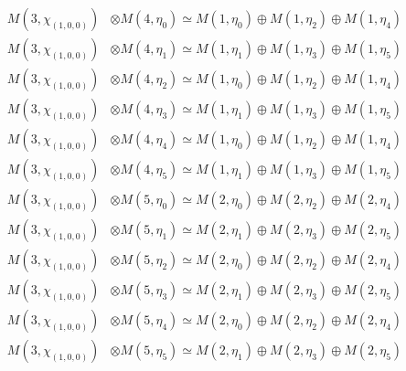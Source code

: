 \begin{align*}
M(3,\chi_{(1,0,0)}) &\otimes M(4,\eta_{0}) \simeq M(1,\eta_{0}) \oplus M(1,\eta_{2}) \oplus M(1,\eta_{4}) \\
M(3,\chi_{(1,0,0)}) &\otimes M(4,\eta_{1}) \simeq M(1,\eta_{1}) \oplus M(1,\eta_{3}) \oplus M(1,\eta_{5}) \\
M(3,\chi_{(1,0,0)}) &\otimes M(4,\eta_{2}) \simeq M(1,\eta_{0}) \oplus M(1,\eta_{2}) \oplus M(1,\eta_{4}) \\
M(3,\chi_{(1,0,0)}) &\otimes M(4,\eta_{3}) \simeq M(1,\eta_{1}) \oplus M(1,\eta_{3}) \oplus M(1,\eta_{5}) \\
M(3,\chi_{(1,0,0)}) &\otimes M(4,\eta_{4}) \simeq M(1,\eta_{0}) \oplus M(1,\eta_{2}) \oplus M(1,\eta_{4}) \\
M(3,\chi_{(1,0,0)}) &\otimes M(4,\eta_{5}) \simeq M(1,\eta_{1}) \oplus M(1,\eta_{3}) \oplus M(1,\eta_{5}) \\
M(3,\chi_{(1,0,0)}) &\otimes M(5,\eta_{0}) \simeq M(2,\eta_{0}) \oplus M(2,\eta_{2}) \oplus M(2,\eta_{4}) \\
M(3,\chi_{(1,0,0)}) &\otimes M(5,\eta_{1}) \simeq M(2,\eta_{1}) \oplus M(2,\eta_{3}) \oplus M(2,\eta_{5}) \\
M(3,\chi_{(1,0,0)}) &\otimes M(5,\eta_{2}) \simeq M(2,\eta_{0}) \oplus M(2,\eta_{2}) \oplus M(2,\eta_{4}) \\
M(3,\chi_{(1,0,0)}) &\otimes M(5,\eta_{3}) \simeq M(2,\eta_{1}) \oplus M(2,\eta_{3}) \oplus M(2,\eta_{5}) \\
M(3,\chi_{(1,0,0)}) &\otimes M(5,\eta_{4}) \simeq M(2,\eta_{0}) \oplus M(2,\eta_{2}) \oplus M(2,\eta_{4}) \\
M(3,\chi_{(1,0,0)}) &\otimes M(5,\eta_{5}) \simeq M(2,\eta_{1}) \oplus M(2,\eta_{3}) \oplus M(2,\eta_{5}) \\
\end{align*}

